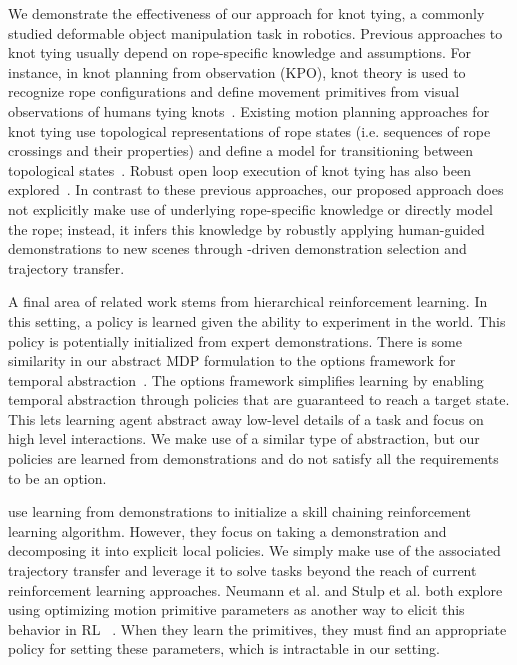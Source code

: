 We demonstrate the effectiveness of our approach for
knot tying, a commonly studied deformable object manipulation task in robotics.
Previous approaches to knot tying usually depend on rope-specific knowledge
and assumptions.
For instance, in knot planning from observation (KPO), knot theory is used
to recognize rope configurations and define
movement primitives from visual observations of humans tying
knots~\cite{Morita_ICRA2003, Takamatsu_TransRob2006}.
Existing motion planning approaches for knot tying use topological
representations of rope states (i.e. sequences of rope crossings and their
properties) and define a model for transitioning between topological
states~\cite{Moll_IEEERobot2006, Saha_ExpRobotics2008, Wakamatsu_IJRR2006}.
Robust open loop execution of knot tying has also been explored~\cite{Bell_PhD2010}.
In contrast to these previous approaches, our proposed approach does not
explicitly make use of underlying rope-specific
knowledge or directly model the rope; instead, it infers this knowledge by
robustly applying human-guided demonstrations to new scenes through
\mmql{}-driven demonstration selection and trajectory transfer.

A final area of related work stems from hierarchical reinforcement learning. 
In this setting, a policy is learned given the ability to experiment in the world.
This policy is potentially initialized from expert demonstrations.
There is some similarity in our abstract MDP formulation to the options 
framework for temporal abstraction~\cite{sutton1999between}.
The options framework simplifies learning by enabling temporal abstraction through
policies that are guaranteed to reach a target state. 
This lets learning agent abstract away low-level details of a task and focus on 
high level interactions. 
We make use of a similar type of abstraction, but our policies are learned from 
demonstrations and do not satisfy all the requirements to be an option.

\citet{konidaris2010constructing} use learning from demonstrations to initialize a skill chaining reinforcement learning algorithm.
However, they focus on taking a demonstration and decomposing it into explicit local policies.
We simply make use of the associated trajectory transfer and leverage it to solve tasks beyond the reach of current reinforcement learning approaches.
Neumann et al. and Stulp et al. both explore using optimizing motion primitive parameters as another way to elicit this behavior in RL ~\cite{Neumann09learningcomplex, Stulp_ROB2012}.
When they learn the primitives, they must find an appropriate policy for setting these parameters, which is intractable in our setting.
